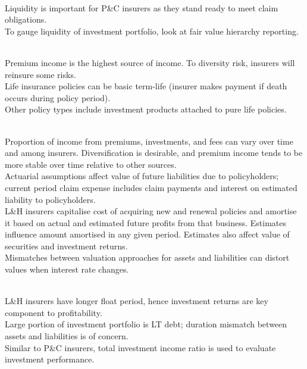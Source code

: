 \begin{remark} \\
Liquidity is important for P\&C insurers as they stand ready to meet claim obligations.\\
To gauge liquidity of investment portfolio, look at fair value hierarchy reporting.
\end{remark}

\begin{remark} \\
Premium income is the highest source of income. To diversity risk, insurers will reinsure some risks.\\
Life insurance policies can be basic term-life (insurer makes payment if death occurs during policy period).\\
Other policy types include investment products attached to pure life policies.
\end{remark}

\begin{remark} \\
Proportion of income from premiums, investments, and fees can vary over time and among insurers. Diversification is desirable, and premium income tends to be more stable over time relative to other sources.\\
Actuarial assumptions affect value of future liabilities due to policyholders; current period claim expense includes claim payments and interest on estimated liability to policyholders.\\
L\&H insurers capitalise cost of acquiring new and renewal policies and amortise it based on actual and estimated future profits from that business. Estimates influence amount amortised in any given period. Estimates also affect value of securities and investment returns.\\
Mismatches between valuation approaches for assets and liabilities can distort values when interest rate changes.
\end{remark}

\begin{remark} \\
L\&H insurers have longer float period, hence investment returns are key component to profitability.\\
Large portion of investment portfolio is LT debt; duration mismatch between assets and liabilities is of concern.\\
Similar to P\&C insurers, total investment income ratio is used to evaluate investment performance.
\end{remark}

